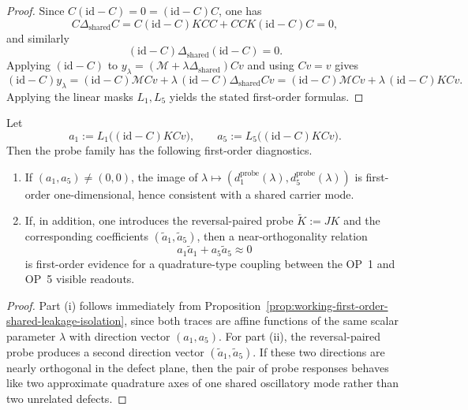 \begin{proof}
Since \(C(\mathrm{id}-C)=0=(\mathrm{id}-C)C\), one has
\[
  C\Delta_{\mathrm{shared}}C
  = C(\mathrm{id}-C)KC C + CCK(\mathrm{id}-C)C = 0,
\]
and similarly
\[
  (\mathrm{id}-C)\Delta_{\mathrm{shared}}(\mathrm{id}-C)=0.
\]
Applying \((\mathrm{id}-C)\) to
\(y_\lambda=(\mathcal M+\lambda\Delta_{\mathrm{shared}})Cv\)
and using \(Cv=v\) gives
\[
  (\mathrm{id}-C)y_\lambda
  = (\mathrm{id}-C)\mathcal M C v + \lambda\,(\mathrm{id}-C)\Delta_{\mathrm{shared}} C v
  = (\mathrm{id}-C)\mathcal M C v + \lambda\,(\mathrm{id}-C)KC v.
\]
Applying the linear masks \(L_1,L_5\) yields the stated first-order formulas.
\end{proof}

\begin{proposition}
\label{prop:working-concrete-probe-family-tests}
Let
\[
  a_1:=L_1\bigl((\mathrm{id}-C)KC v\bigr),
  \qquad
  a_5:=L_5\bigl((\mathrm{id}-C)KC v\bigr).
\]
Then the probe family has the following first-order diagnostics.
\begin{enumerate}[label=(\roman*), leftmargin=2em]
  \item If \((a_1,a_5)\neq (0,0)\), the image of
  \(\lambda\mapsto (d^{\mathrm{probe}}_1(\lambda),d^{\mathrm{probe}}_5(\lambda))\)
  is first-order one-dimensional, hence consistent with a shared carrier mode.
  \item If, in addition, one introduces the reversal-paired probe
  \(\widetilde K:=JK\) and the corresponding coefficients
  \((\tilde a_1,\tilde a_5)\), then a near-orthogonality relation
  \[
    a_1\tilde a_1 + a_5\tilde a_5 \approx 0
  \]
  is first-order evidence for a quadrature-type coupling between the OP~1 and OP~5 visible readouts.
\end{enumerate}
\end{proposition}

\begin{proof}
Part (i) follows immediately from Proposition~\ref{prop:working-first-order-shared-leakage-isolation}, since both traces are affine functions of the same scalar parameter \(\lambda\) with direction vector \((a_1,a_5)\). For part (ii), the reversal-paired probe produces a second direction vector \((\tilde a_1,\tilde a_5)\). If these two directions are nearly orthogonal in the defect plane, then the pair of probe responses behaves like two approximate quadrature axes of one shared oscillatory mode rather than two unrelated defects.
\end{proof}

